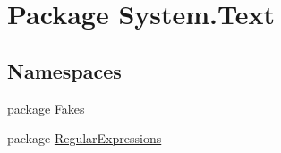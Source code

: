 \hypertarget{namespace_system_1_1_text}{\section{Package System.\-Text}
\label{namespace_system_1_1_text}
}
\subsection*{Namespaces}
\begin{DoxyCompactItemize}
\item 
package \hyperlink{namespace_system_1_1_text_1_1_fakes}{Fakes}
\item 
package \hyperlink{namespace_system_1_1_text_1_1_regular_expressions}{Regular\-Expressions}
\end{DoxyCompactItemize}
